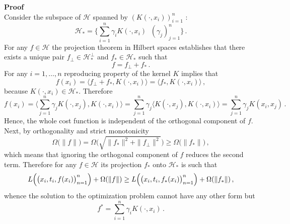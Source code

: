 \documentclass[a4paper]{article}
\newcommand{\Hcal}{\mathcal{H}}
\begin{document}
\noindent\textbf{Proof} \hfill \\
Consider the subspace of $\Hcal$ spanned by $(K(\cdot, x_i ))_{i=1}^n$ :
\[
\Hcal_* = \bigl\{ \sum_{i=1}^n \gamma_i K(\cdot, x_i ) \,\:\,(\gamma_j)_{j=1}^n \bigr\}\,.
\]
For any $f\in \Hcal$ the projection theorem in Hilbert spaces establishes that there
exists a unique pair $f_\perp \in\Hcal_*^\perp$ and $f_* \in \Hcal_*$ such that
\[ f = f_\perp + f_* \,. \]
For any $i=1,\ldots,n$ reproducing property of the kernel $K$ implies that
\[
f(x_i)
= \langle f_\perp + f_*, K(\cdot, x_i)\rangle
= \langle f_*, K(\cdot, x_i)\rangle\,,
\]
because $K(\cdot, x_i)\in \Hcal_*$. Therefore
\[
f(x_i)
= \bigl\langle \sum_{j=1}^n \gamma_j K(\cdot, x_j ), K(\cdot, x_i)\bigr\rangle 
= \sum_{j=1}^n \gamma_j \langle K(\cdot, x_j ), K(\cdot, x_i)\rangle 
= \sum_{j=1}^n \gamma_j K(x_i, x_j)\,.
\]
Hence, the whole cost function is independent of the orthogonal component of $f$.
Next, by orthogonality and strict monotonicity
\[
\Omega\bigl( \|f\| \bigr)
= \Omega\bigl( \sqrt{\|f_*\|^2 + \|f_\perp\|^2} \bigr)
\geq \Omega\bigl( \|f_*\| \bigr)\,,
\]
which means that ignoring the orthogonal component of $f$ reduces the second term.
Therefore for any $f\in \Hcal$ its projection $f_*$ onto $\Hcal_*$ is such that
\[
L\Bigl( \bigl(x_i,t_i,f(x_i)\bigr)_{n=1}^n \Bigr) + \Omega(\|f\|)
\geq L\Bigl( \bigl(x_i,t_i,f_*(x_i)\bigr)_{n=1}^n \Bigr) + \Omega(\|f_*\|)\,,
\]
whence the solution to the optimization problem cannot have any other form but
\[ f^* = \sum_{i=1}^n \gamma_i K(\cdot, x_i)\,. \]
\end{document}
